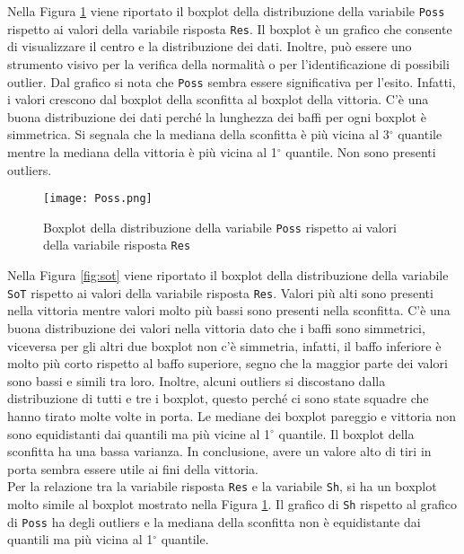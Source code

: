 Nella Figura \ref{fig:Poss} viene riportato il boxplot della distribuzione della variabile \texttt{Poss} rispetto ai valori della variabile risposta \texttt{Res}. Il boxplot è un grafico che consente di visualizzare il centro e la distribuzione dei dati. Inoltre, può essere uno strumento visivo per la verifica della normalità o per l'identificazione di possibili outlier. Dal grafico si nota che \texttt{Poss} sembra essere significativa per l'esito. Infatti, i valori crescono dal boxplot della sconfitta al boxplot della vittoria. C'è una buona distribuzione dei dati perché la lunghezza dei baffi per ogni boxplot è simmetrica. Si segnala che la mediana della sconfitta è più vicina al 3$^{\circ}$ quantile mentre la mediana della vittoria è più vicina al 1$^{\circ}$ quantile. Non sono presenti outliers.\\
\begin{figure}[htbp]
	\begin{center}
		\texttt{[image: Poss.png]}
		\caption{Boxplot della distribuzione della variabile \texttt{Poss} rispetto ai valori della variabile risposta \texttt{Res}} \label{fig:Poss}
	\end{center}
\end{figure}
Nella Figura \ref{fig:sot} viene riportato il boxplot della distribuzione della variabile \texttt{SoT} rispetto ai valori della variabile risposta \texttt{Res}. Valori più alti sono presenti nella vittoria mentre valori molto più bassi sono presenti nella sconfitta. C'è una buona distribuzione dei valori nella vittoria dato che i baffi sono simmetrici, viceversa per gli altri due boxplot non c'è simmetria, infatti, il baffo inferiore è molto più corto rispetto al baffo superiore, segno che la maggior parte dei valori sono bassi e simili tra loro. Inoltre, alcuni outliers si discostano dalla distribuzione di tutti e tre i boxplot, questo perché ci sono state squadre che hanno tirato molte volte in porta. Le mediane dei boxplot pareggio e vittoria non sono equidistanti dai quantili ma più vicine al 1$^{\circ}$ quantile. Il boxplot della sconfitta ha una bassa varianza. In conclusione, avere un valore alto di tiri in porta sembra essere utile ai fini della vittoria.\\
Per la relazione tra la variabile risposta \texttt{Res} e la variabile \texttt{Sh}, si ha un boxplot molto simile al boxplot mostrato nella Figura \ref{fig:Poss}. Il grafico di \texttt{Sh} rispetto al grafico di \texttt{Poss} ha degli outliers e la mediana della sconfitta non è equidistante dai quantili ma più vicina al 1$^{\circ}$ quantile.\\
